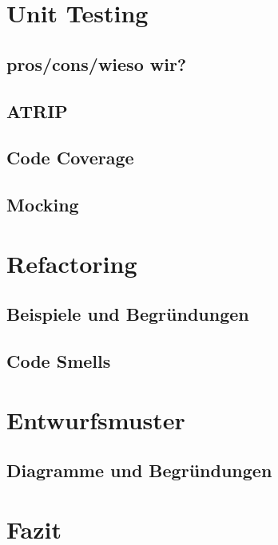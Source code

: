 \documentclass{article}
\begin{document}
\section{Unit Testing}
\subsection{pros/cons/wieso wir?}
\subsection{ATRIP}
\subsection{Code Coverage}
\subsection{Mocking}

\section{Refactoring}
\subsection{Beispiele und Begründungen}
\subsection{Code Smells}

\section{Entwurfsmuster}
\subsection{Diagramme und Begründungen}

\section{Fazit}\label{sec:end}
\end{document}
